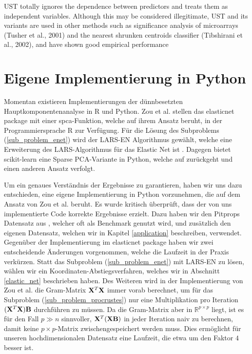 UST totally ignores the dependence between predictors and treats them as independent variables. Although this may be considered illegitimate, UST and its variants are used in other methods such as significance analysis of microarrays (Tusher et al., 2001) and the nearest shrunken
centroids classifier (Tibshirani et al., 2002), and have shown good empirical performance




\section{Eigene Implementierung in Python}

Momentan existieren Implementierungen der dünnbesetzten Hauptkomponentenanalyse in R und Python. Zou et al. stellen das elasticnet package mit einer spca-Funktion, welche auf ihrem Ansatz beruht, in der Programmiersprache R zur Verfügung. Für die Lösung des Subproblems (\ref{sub_problem_enet}) wird der LARS-EN Algorithmus gewählt, welche eine Erweiterung des LARS-Algorithmus für das Elastic Net ist \cite{zou_elasticnet}. Dagegen bietet scikit-learn eine Sparse PCA-Variante in Python, welche auf \cite{jenatton} zurückgeht und einen anderen Ansatz verfolgt.

Um ein genaues Verständnis der Ergebnisse zu garantieren, haben wir uns dazu entschieden, eine eigene Implementierung in Python vorzunehmen, die auf dem Ansatz von Zou et al. beruht. Es wurde kritisch überprüft, dass der von uns implementierte Code korrekte Ergebnisse erzielt. Dazu haben  wir den Pitprops Datensatz aus \cite{zou_sparsepca}, welcher oft als Benchmark genutzt wird, und zusätzlich den eigenen Datensatz, welchen wir in Kapitel \ref{application} beschreiben, verwendet. Gegenüber der Implementierung im elasticnet package haben wir zwei entscheidende Änderungen vorgenommen, welche die Laufzeit in der Praxis verkürzen. Statt das Subproblem (\ref{sub_problem_enet}) mit LARS-EN zu lösen, wählen wir ein Koordinaten-Abstiegsverfahren, welches wir in Abschnitt \ref{elastic_net} beschrieben haben. Des Weiteren wird in der Implementierung von Zou et al. die Gram-Matrix $\mathbf{X}^T \mathbf{X}$ immer vorab berechnet, um für das Subproblem (\ref{sub_problem_procrustes}) nur eine Multiplikation pro Iteration $(\mathbf{X}^T \mathbf{X}) \mathbf{B}$ durchführen zu müssen. Da die Gram-Matrix aber in $\mathbb{R}^{p \times p}$ liegt, ist es für den Fall $p \gg n$ sinnvoller, $\mathbf{X}^T (\mathbf{X} \mathbf{B})$ in jeder Iteration naiv zu berechnen, damit keine $p \times p$-Matrix zwischengespeichert werden muss. Dies ermöglicht für unseren hochdimensionalen Datensatz eine Laufzeit, die etwa um den Faktor $4$ besser ist.


